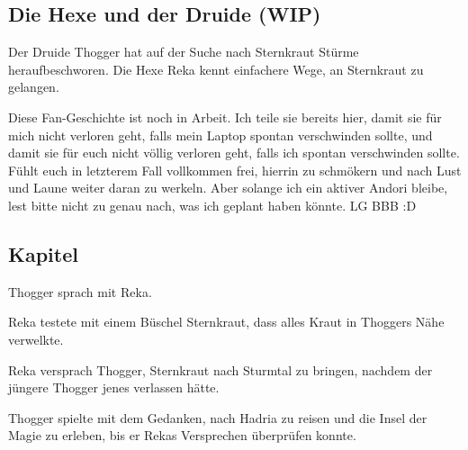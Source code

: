 \begin{chapterbox}
    \chapter{Die Hexe und der Druide (WIP)}
    \label{wip-die-hexe-und-der-druide}

    Der Druide Thogger hat auf der Suche nach Sternkraut Stürme heraufbeschworen. Die Hexe Reka kennt einfachere Wege, an Sternkraut zu gelangen.
\end{chapterbox}



Diese Fan-Geschichte ist noch in Arbeit. Ich teile sie bereits hier, damit sie für mich nicht verloren geht, falls mein Laptop spontan verschwinden sollte, und damit sie für euch nicht völlig verloren geht, falls ich spontan verschwinden sollte. Fühlt euch in letzterem Fall vollkommen frei, hierrin zu schmökern und nach Lust und Laune weiter daran zu werkeln. Aber solange ich ein aktiver Andori bleibe, lest bitte nicht zu genau nach, was ich geplant haben könnte. LG BBB :D



\newpage
\section{Kapitel}



Thogger sprach mit Reka.

Reka testete mit einem Büschel Sternkraut, dass alles Kraut in Thoggers Nähe verwelkte.

Reka versprach Thogger, Sternkraut nach Sturmtal zu bringen, nachdem der jüngere Thogger jenes verlassen hätte.

Thogger spielte mit dem Gedanken, nach Hadria zu reisen und die Insel der Magie zu erleben, bis er Rekas Versprechen überprüfen konnte.